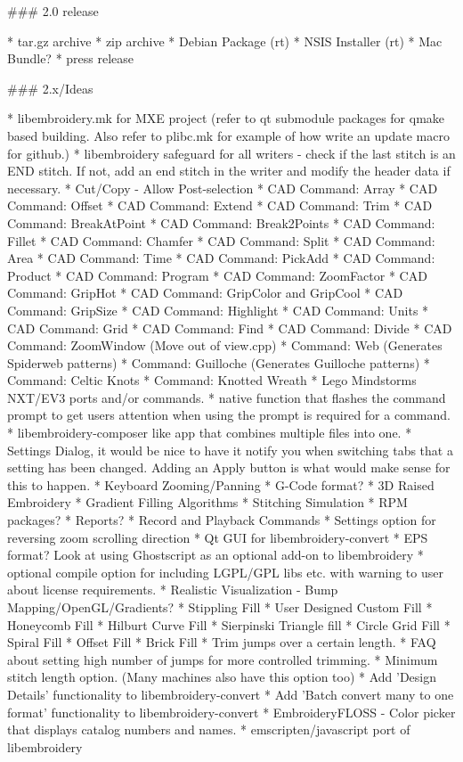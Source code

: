 ### 2.0 release

* tar.gz archive
* zip archive
* Debian Package (rt)
* NSIS Installer (rt)
* Mac Bundle?
* press release

### 2.x/Ideas

* libembroidery.mk for MXE project (refer to qt submodule packages for qmake based building. Also refer to plibc.mk for example of how write an update macro for github.)
* libembroidery safeguard for all writers - check if the last stitch is an END stitch. If not, add an end stitch in the writer and modify the header data if necessary.
* Cut/Copy - Allow Post-selection
* CAD Command: Array
* CAD Command: Offset
* CAD Command: Extend
* CAD Command: Trim
* CAD Command: BreakAtPoint
* CAD Command: Break2Points
* CAD Command: Fillet
* CAD Command: Chamfer
* CAD Command: Split
* CAD Command: Area
* CAD Command: Time
* CAD Command: PickAdd
* CAD Command: Product
* CAD Command: Program
* CAD Command: ZoomFactor
* CAD Command: GripHot
* CAD Command: GripColor and GripCool
* CAD Command: GripSize
* CAD Command: Highlight
* CAD Command: Units
* CAD Command: Grid
* CAD Command: Find
* CAD Command: Divide
* CAD Command: ZoomWindow (Move out of view.cpp)
* Command: Web (Generates Spiderweb patterns)
* Command: Guilloche (Generates Guilloche patterns)
* Command: Celtic Knots
* Command: Knotted Wreath
* Lego Mindstorms NXT/EV3 ports and/or commands.
* native function that flashes the command prompt to get users attention when using the prompt is required for a command.
* libembroidery-composer like app that combines multiple files into one.
* Settings Dialog, it would be nice to have it notify you when switching tabs that a setting has been changed. Adding an Apply button is what would make sense for this to happen.
* Keyboard Zooming/Panning
* G-Code format?
* 3D Raised Embroidery
* Gradient Filling Algorithms
* Stitching Simulation
* RPM packages?
* Reports?
* Record and Playback Commands
* Settings option for reversing zoom scrolling direction
* Qt GUI for libembroidery-convert
* EPS format? Look at using Ghostscript as an optional add-on to libembroidery
* optional compile option for including LGPL/GPL libs etc. with warning to user about license requirements.
* Realistic Visualization - Bump Mapping/OpenGL/Gradients?
* Stippling Fill
* User Designed Custom Fill
* Honeycomb Fill
* Hilburt Curve Fill
* Sierpinski Triangle fill
* Circle Grid Fill
* Spiral Fill
* Offset Fill
* Brick Fill
* Trim jumps over a certain length.
* FAQ about setting high number of jumps for more controlled trimming.
* Minimum stitch length option. (Many machines also have this option too)
* Add 'Design Details' functionality to libembroidery-convert
* Add 'Batch convert many to one format' functionality to libembroidery-convert
* EmbroideryFLOSS - Color picker that displays catalog numbers and names.
* emscripten/javascript port of libembroidery

